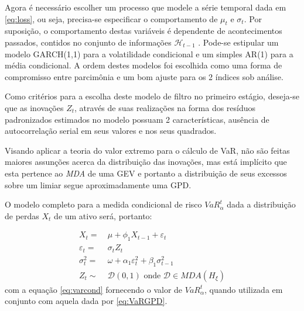 \documentclass[1p]{elsarticle}
\theoremstyle{definition}
\begin{document}
Agora é necessário escolher um processo que modele a série temporal dada em \eqref{eq:loss}, ou seja, precisa-se especificar o comportamento de $\mu_t$ e $\sigma_t$. Por suposição, o comportamento destas variáveis é dependente de acontecimentos passados, contidos no conjunto de informações $\mathcal{H}_{t-1}$ . Pode-se estipular um modelo GARCH(1,1) para a volatilidade condicional e um simples AR(1) para a média condicional. A ordem destes modelos foi escolhida como uma forma de compromisso entre parcimônia e um bom ajuste para os 2 índices sob análise.

Como critérios para a escolha deste modelo de filtro no primeiro estágio, deseja-se que as inovações $Z_t$, através de suas realizações na forma dos resíduos padronizados estimados no modelo possuam 2 características, ausência de autocorrelação serial em seus valores e nos seus quadrados.

Visando aplicar a teoria do valor extremo para o cálculo de VaR, não são feitas maiores assunções acerca da distribuição das inovações, mas está implícito que esta pertence ao \emph{MDA} de uma GEV e portanto a distribuição de seus excessos sobre um limiar segue aproximadamente uma GPD.

O modelo completo para a medida condicional de risco $VaR_\alpha^t$ dada a distribuição de perdas $X_t$ de um ativo será, portanto:

\begin{align}
X_t=\ &\mu+ \phi_1 X_{t-1}+\varepsilon_t \\
\varepsilon_t=\ &\sigma_t Z_t\\
\sigma_t^2=\ &\omega+ \alpha_1 \varepsilon_t^2 + \beta_1 \sigma_{t-1}^2 \label{eq:sigma2} \\
Z_t\sim &\mathcal{D}(0,1) \text{ onde } \mathcal{D} \in MDA(H_\xi)
\end{align}
com a equação \eqref{eq:varcond} fornecendo o valor de $VaR_\alpha^t$, quando utilizada em conjunto com aquela dada por \eqref{eq:VaRGPD}.

\end{document}
